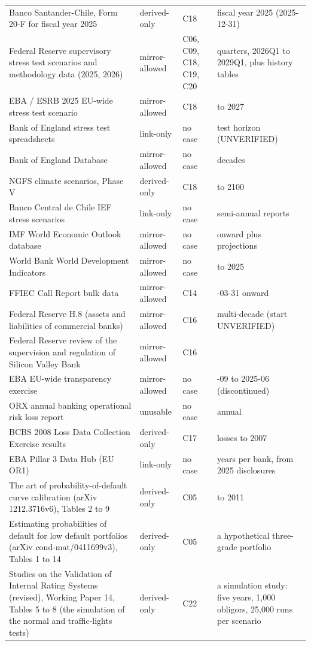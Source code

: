 {\begin{longtable}{>{\raggedright\arraybackslash}p{6.4cm}>{\raggedright\arraybackslash}p{2.2cm}>{\raggedright\arraybackslash}p{2.8cm}>{\raggedright\arraybackslash}p{3.0cm}}
Banco Santander-Chile, Form 20-F for fiscal year 2025 & derived-only & C18 & fiscal year 2025 (2025-12-31) \\
Federal Reserve supervisory stress test scenarios and methodology data (2025, 2026) & mirror-allowed & C06, C09, C18, C19, C20 & 13 quarters, 2026Q1 to 2029Q1, plus history tables \\
EBA / ESRB 2025 EU-wide stress test scenario & mirror-allowed & C18 & 2025 to 2027 \\
Bank of England stress test spreadsheets & link-only & no case & 2025 test horizon (UNVERIFIED) \\
Bank of England Database & mirror-allowed & no case & decades \\
NGFS climate scenarios, Phase V & derived-only & C18 & to 2100 \\
Banco Central de Chile IEF stress scenarios & link-only & no case & semi-annual reports \\
IMF World Economic Outlook database & mirror-allowed & no case & 1980 onward plus projections \\
World Bank World Development Indicators & mirror-allowed & no case & 1960 to 2025 \\
FFIEC Call Report bulk data & mirror-allowed & C14 & 2001-03-31 onward \\
Federal Reserve H.8 (assets and liabilities of commercial banks) & mirror-allowed & C16 & multi-decade (start UNVERIFIED) \\
Federal Reserve review of the supervision and regulation of Silicon Valley Bank & mirror-allowed & C16 & 2023 \\
EBA EU-wide transparency exercise & mirror-allowed & no case & 2024-09 to 2025-06 (discontinued) \\
ORX annual banking operational risk loss report & unusable & no case & annual \\
BCBS 2008 Loss Data Collection Exercise results & derived-only & C17 & losses to 2007 \\
EBA Pillar 3 Data Hub (EU OR1) & link-only & no case & 10 years per bank, from 2025 disclosures \\
The art of probability-of-default curve calibration (arXiv 1212.3716v6), Tables 2 to 9 & derived-only & C05 & 2009 to 2011 \\
Estimating probabilities of default for low default portfolios (arXiv cond-mat/0411699v3), Tables 1 to 14 & derived-only & C05 & a hypothetical three-grade portfolio \\
Studies on the Validation of Internal Rating Systems (revised), Working Paper 14, Tables 5 to 8 (the simulation of the normal and traffic-lights tests) & derived-only & C22 & a simulation study: five years, 1,000 obligors, 25,000 runs per scenario \\

\end{longtable}}
